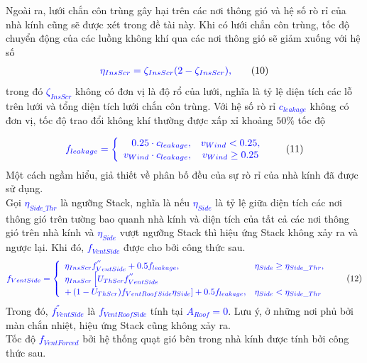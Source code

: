 \documentclass[13pt,a4paper]{article}
\begin{document}
			Ngoài ra, lưới chắn côn trùng gây hại trên các nơi thông gió và hệ số rò rỉ của nhà kính cũng sẽ được xét trong đề tài này. Khi có lưới chắn côn trùng, tốc độ chuyển động của các luồng không khí qua các nơi thông gió sẽ giảm xuống với hệ số
			\begin{align}
				\textcolor{blue}{\eta_{InsScr} = \zeta_{InsScr}(2 - \zeta_{InsScr}),}
				\tag{10} \label{ct10}
			\end{align}
			trong đó \textcolor{blue}{$\zeta_{InsScr}$} không có đơn vị là độ rổ của lưới, nghĩa là tỷ lệ diện tích các lỗ trên lưới và tổng diện tích lưới chắn côn trùng. Với hệ số rò rỉ \textcolor{blue}{$c_{leakage}$} không có đơn vị, tốc độ trao đổi không khí thường được xấp xỉ khoảng $50\%$ tốc độ
	
			\begin{align}
				\textcolor{blue}{f_{leakage} = \left\{\begin{array}{rcl}
					0.25\cdot c_{leakage}, & v_{Wind} < 0.25, \\
					v_{Wind}\cdot c_{leakage}, & v_{Wind} \geq 0.25
				\end{array}\right.}
				\tag{11} \label{ct11}
			\end{align}
			Một cách ngầm hiểu, giả thiết về phân bố đều của sự rò rỉ của nhà kính đã được sử dụng. \\
			Gọi \textcolor{blue}{$\eta_{Side\_Thr}$} là ngưỡng Stack, nghĩa là nếu \textcolor{blue}{$\eta_{Side}$} là tỷ lệ giữa diện tích các nơi thông gió trên tường bao quanh nhà kính và diện tích của tất cả các nơi thông gió trên nhà kính và \textcolor{blue}{$\eta_{Side}$} vượt ngưỡng Stack thì hiệu ứng Stack không xảy ra và ngược lại. Khi đó, \textcolor{blue}{$f_{VentSide}$} được cho bởi công thức sau.
			\begin{align}
				\textcolor{blue}{f_{VentSide} = \left\{\begin{array}{lll}
						\eta_{InsScr}f^{''}_{VentSide} + 0.5f_{leakage}, & \eta_{Side} \geq \eta_{Side\_Thr}, \\
						\eta_{InsScr}\left[U_{ThScr}f^{''}_{VentSide}\right.  \\
						+ \left(1 - U_{ThScr})f_{VentRoofSide}\eta_{Side}\right] + 0.5f_{leakage}, & \eta_{Side} < \eta_{Side\_Thr}
					\end{array}\right.}
				\tag{12} \label{ct12}
			\end{align}
			Trong đó, \textcolor{blue}{$f^{''}_{VentSide}$} là \textcolor{blue}{$f_{VentRoofSide}$} tính tại \textcolor{blue}{$A_{Roof} = 0$}. Lưu ý, ở những nơi phủ bởi màn chắn nhiệt, hiệu ứng Stack cũng không xảy ra. \\
			Tốc độ \textcolor{blue}{$f_{VentForced}$} bởi hệ thống quạt gió bên trong nhà kính được tính bởi công thức sau.
	
\end{document}
